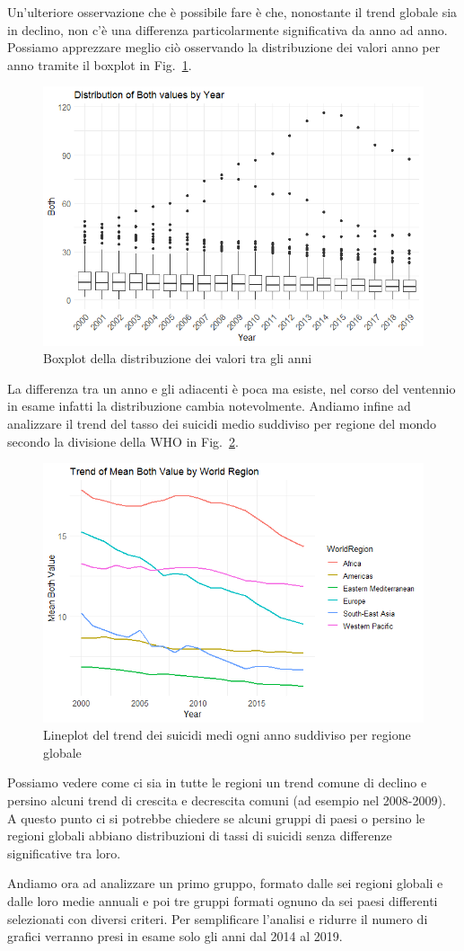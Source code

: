 \documentclass[conference]{IEEEtran}
\begin{document}
Un'ulteriore osservazione che è possibile fare è
che, nonostante il trend globale sia in declino, non c'è una differenza
particolarmente significativa da anno ad anno. Possiamo apprezzare meglio
ciò osservando la distribuzione dei valori anno per anno tramite il boxplot
in Fig.~\ref{3boxyears}.
\begin{figure}[htbp]
    \centerline{\includegraphics[width=.5\textwidth]{img/3 - Boxyears2.png}}
    \caption{Boxplot della distribuzione dei valori tra gli anni}
    \label{3boxyears}
\end{figure}
La differenza tra un anno e gli adiacenti è poca ma esiste, nel corso del ventennio
in esame infatti la distribuzione cambia notevolmente.
Andiamo infine ad analizzare il trend del tasso dei suicidi medio suddiviso
per regione del mondo secondo la divisione della WHO in Fig.~\ref{4wrtrend}.

\begin{figure}[htbp]
    \centerline{\includegraphics[width=.5\textwidth]{img/4 - WRTrend2.png}}
    \caption{Lineplot del trend dei suicidi medi ogni anno suddiviso per regione globale}
    \label{4wrtrend}
\end{figure}

Possiamo vedere come ci sia in tutte le regioni un trend comune di declino e persino
alcuni trend di crescita e decrescita comuni (ad esempio nel 2008-2009).
A questo punto ci si potrebbe chiedere se alcuni gruppi
di paesi o persino le regioni globali abbiano
distribuzioni di tassi di suicidi senza differenze significative tra loro.

Andiamo ora ad analizzare
un primo gruppo, formato dalle sei regioni globali e dalle loro medie annuali
e poi tre gruppi formati ognuno da sei paesi differenti selezionati con diversi criteri.
Per semplificare l'analisi e ridurre il numero di grafici verranno presi in esame solo
gli anni dal 2014 al 2019.
\end{document}
